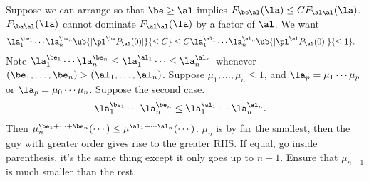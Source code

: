 Suppose we can arrange so that $\be\ge \al$ implies $F_{\be \al}(\la) \le C F_{\al\al}(\la)$. %
 $F_{\ba\al}(\la)$ cannot dominate $F_{\al\al}(\la)$ by a factor of $\al$. 
We want 
\begin{align}
\la_1^{\be_1}\cdots \la_n^{\be_n}\ub{|\pl^\be P_\al(0)|}{\le C}
&\le C\la_1^{\al_1}\cdots \la_n^{\al_n}\ub{|\pl^\al P_\al(0)|}{\le 1}.
\end{align}
Note $\la_1^{\be_1}\cdots \la_n^{\be_n}\le \la_1^{\al_1}\cdots \le \la_n^{\al_n}$ whenever $(\be_1,\ldots, \be_n) > (\al_1,\ldots, \al_n)$. 
Suppose $\mu_1,\ldots, \mu_n\le 1$, and $\la_p = \mu_1\cdots \mu_p$ or $\la_p = \mu_0\cdots \mu_n$.  Suppose the second case. 
\begin{align}
\la_1^{\be_1}\cdots \la_n^{\be_n} &\le \la_1^{\al_1}\cdots \la_n^{\al_n}. 
\end{align}
Then $\mu_n^{\be_1+\cdots +\be_n}(\cdots) \le \mu^{\al_1+\cdots \al_n}(\cdots)$. 
$\mu_n$ is by far the smallest, then the guy with greater order gives rise to the greater RHS. If equal, go inside parenthesis, it's the same thing except it only goes up to $n-1$. Ensure that $\mu_{n-1}$ is much smaller than the rest. 


 
 
 